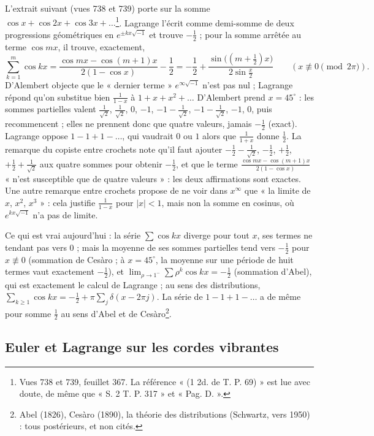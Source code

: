 \documentclass[11pt,a4paper]{article}
\begin{document}
L'extrait suivant (vues 738 et 739) porte sur la somme $\cos x+\cos2x+\cos3x+\dots$\footnote{Vues 738 et 739, feuillet 367. La référence « (1 2d. de T. P. 69) » est lue avec doute, de même que « S. 2 T. P. 317 » et « Pag. D. ».}. Lagrange l'écrit comme demi-somme de deux progressions géométriques en $e^{\pm kx\sqrt{-1}}$ et trouve $-\frac12$ ; pour la somme arrêtée au terme $\cos mx$, il trouve, exactement,
\[ \sum_{k=1}^{m}\cos kx=\frac{\cos mx-\cos(m+1)x}{2(1-\cos x)}-\frac12=-\frac12+\frac{\sin\bigl((m+\frac12)x\bigr)}{2\sin\frac x2}\qquad(x\not\equiv0\pmod{2\pi}). \]
D'Alembert objecte que le « dernier terme » $e^{\infty\sqrt{-1}}$ n'est pas nul ; Lagrange répond qu'on substitue bien $\frac{1}{1-x}$ à $1+x+x^2+\dots$ D'Alembert prend $x=45^\circ$ : les sommes partielles valent $\frac{1}{\sqrt2}$, $\frac1{\sqrt2}$, $0$, $-1$, $-1-\frac1{\sqrt2}$, $-1-\frac1{\sqrt2}$, $-1$, $0$, puis recommencent ; elles ne prennent donc que quatre valeurs, jamais $-\frac12$ (exact). Lagrange oppose $1-1+1-\dots$, qui vaudrait $0$ ou $1$ alors que $\frac{1}{1+x}$ donne $\frac12$. La remarque du copiste entre crochets note qu'il faut ajouter $-\frac12-\frac1{\sqrt2}$, $-\frac12$, $+\frac12$, $+\frac12+\frac1{\sqrt2}$ aux quatre sommes pour obtenir $-\frac12$, et que le terme $\frac{\cos mx-\cos(m+1)x}{2(1-\cos x)}$ « n'est susceptible que de quatre valeurs » : les deux affirmations sont exactes. Une autre remarque entre crochets propose de ne voir dans $x^\infty$ que « la limite de $x$, $x^2$, $x^3$ » : cela justifie $\frac{1}{1-x}$ pour $|x|<1$, mais non la somme en cosinus, où $e^{kx\sqrt{-1}}$ n'a pas de limite.

Ce qui est vrai aujourd'hui : la série $\sum\cos kx$ diverge pour tout $x$, ses termes ne tendant pas vers $0$ ; mais la moyenne de ses sommes partielles tend vers $-\frac12$ pour $x\not\equiv 0$ (sommation de Cesàro ; à $x=45^\circ$, la moyenne sur une période de huit termes vaut exactement $-\frac12$), et $\lim_{\rho\to1^-}\sum\rho^k\cos kx=-\frac12$ (sommation d'Abel), qui est exactement le calcul de Lagrange ; au sens des distributions, $\sum_{k\ge1}\cos kx=-\frac12+\pi\sum_{j}\delta(x-2\pi j)$. La série de $1-1+1-\dots$ a de même pour somme $\frac12$ au sens d'Abel et de Cesàro\footnote{Abel (1826), Cesàro (1890), la théorie des distributions (Schwartz, vers 1950) : tous postérieurs, et non cités.}.

\subsection*{Euler et Lagrange sur les cordes vibrantes}
\end{document}
